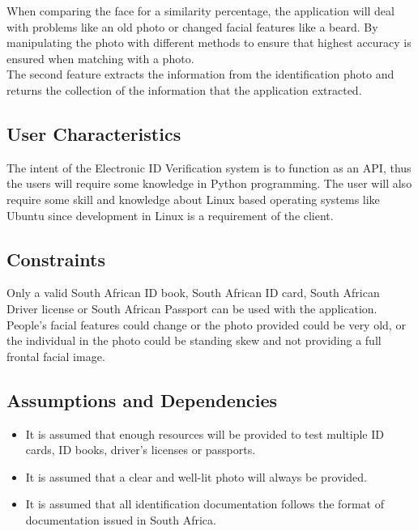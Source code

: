 \documentclass{article}
\def \project{Electronic ID Verification }
\begin{document}
		  \noindent When comparing the face for a similarity percentage, the application will deal with problems like an old photo or changed facial features like a beard. By manipulating the photo with different methods to ensure that highest accuracy is ensured when matching with a photo.\\
		  
		  \noindent The second feature extracts the information from the identification photo and returns the collection of the information that the application extracted.

		\subsection{User Characteristics}\label{subsec:overall-user-characteristics}
		    The intent of the \project system is to function as an API, thus the users will require some knowledge in Python programming. The user will also require some skill and knowledge about Linux based operating systems like Ubuntu since development in Linux is a requirement of the client.

		\subsection{Constraints}\label{subsec:overall-constraints}
			Only a valid South African ID book, South African ID card, South African Driver license or South African Passport can be used with the application.\\
			
			\noindent People's facial features could change or the photo provided could be very old, or the individual in the photo could be standing skew and not providing a full frontal facial image.

		\subsection{Assumptions and Dependencies}\label{subsec:overall-asusmptions-and-dependencies}
		\begin{itemize}
		    \item It is assumed that enough resources will be provided to test multiple ID cards, ID books, driver's licenses or passports.
		    \item It is assumed that a clear and well-lit photo will always be provided.
		    \item It is assumed that all identification documentation follows the format of documentation issued in South Africa.
		\end{itemize}
			
\end{document}
